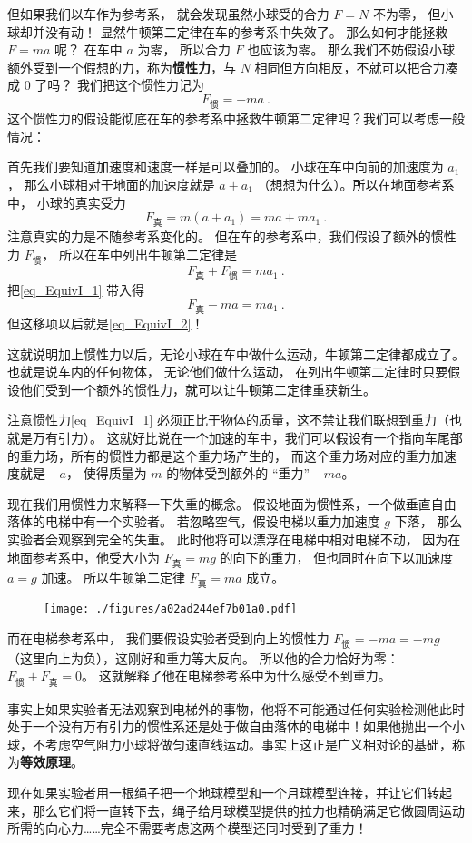 但如果我们以车作为参考系， 就会发现虽然小球受的合力 $F = N$ 不为零， 但小球却并没有动！ 显然牛顿第二定律在车的参考系中失效了。 那么如何才能拯救 $F = ma$ 呢？ 在车中 $a$ 为零， 所以合力 $F$ 也应该为零。 那么我们不妨假设小球额外受到一个假想的力，称为\textbf{惯性力}，与 $N$ 相同但方向相反，不就可以把合力凑成 0 了吗？ 我们把这个惯性力记为
\begin{equation}\label{eq_EquivI_1}
F_\text{惯} = -ma~.
\end{equation}
这个惯性力的假设能彻底在车的参考系中拯救牛顿第二定律吗？我们可以考虑一般情况：

首先我们要知道加速度和速度一样是可以叠加的。 小球在车中向前的加速度为 $a_1$， 那么小球相对于地面的加速度就是 $a + a_1$ （想想为什么）。所以在地面参考系中， 小球的真实受力
\begin{equation}\label{eq_EquivI_2}
F_\text{真} = m(a + a_1) = ma + ma_1~.
\end{equation}
注意真实的力是不随参考系变化的。 但在车的参考系中，我们假设了额外的惯性力 $F_\text{惯}$， 所以在车中列出牛顿第二定律是
\begin{equation}
F_\text{真} + F_\text{惯} = ma_1~.
\end{equation}
把\autoref{eq_EquivI_1} 带入得
\begin{equation}
F_\text{真} -ma = ma_1~.
\end{equation}
但这移项以后就是\autoref{eq_EquivI_2}！

这就说明加上惯性力以后，无论小球在车中做什么运动，牛顿第二定律都成立了。也就是说车内的任何物体， 无论他们做什么运动， 在列出牛顿第二定律时只要假设他们受到一个额外的惯性力，就可以让牛顿第二定律重获新生。

注意惯性力\autoref{eq_EquivI_1} 必须正比于物体的质量，这不禁让我们联想到重力（也就是万有引力）。 这就好比说在一个加速的车中，我们可以假设有一个指向车尾部的重力场，所有的惯性力都是这个重力场产生的， 而这个重力场对应的重力加速度就是 $-a$， 使得质量为 $m$ 的物体受到额外的 “重力” $-ma$。

现在我们用惯性力来解释一下失重的概念。 假设地面为惯性系，一个做垂直自由落体的电梯中有一个实验者。 若忽略空气，假设电梯以重力加速度 $g$ 下落， 那么实验者会观察到完全的失重。 此时他将可以漂浮在电梯中相对电梯不动， 因为在地面参考系中，他受大小为 $F_\text{真}=mg$ 的向下的重力， 但也同时在向下以加速度 $a = g$ 加速。 所以牛顿第二定律 $F_\text{真}=ma$ 成立。

\begin{figure}[ht]
\centering
\texttt{[image: ./figures/a02ad244ef7b01a0.pdf]}
\caption{} \label{fig_EquivI_2}
\end{figure}
而在电梯参考系中， 我们要假设实验者受到向上的惯性力 $F_\text{惯} = -ma = -mg$ （这里向上为负），这刚好和重力等大反向。 所以他的合力恰好为零： $F_\text{惯} + F_\text{真} = 0$。 这就解释了他在电梯参考系中为什么感受不到重力。

事实上如果实验者无法观察到电梯外的事物，他将不可能通过任何实验检测他此时处于一个没有万有引力的惯性系还是处于做自由落体的电梯中！如果他抛出一个小球，不考虑空气阻力小球将做匀速直线运动。事实上这正是广义相对论的基础，称为\textbf{等效原理}。

现在如果实验者用一根绳子把一个地球模型和一个月球模型连接，并让它们转起来，那么它们将一直转下去，绳子给月球模型提供的拉力也精确满足它做圆周运动所需的向心力……完全不需要考虑这两个模型还同时受到了重力！


